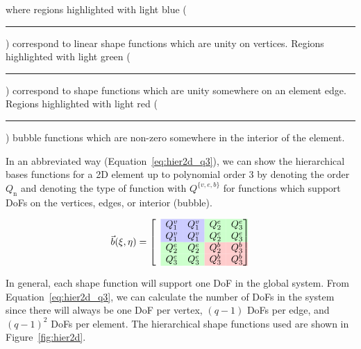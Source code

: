 \documentclass[11pt]{style/memo}
\begin{document}
where regions highlighted with light blue ({\color{blue!20!white}\rule{1em}{1em}})
correspond to linear shape functions which are unity on vertices. Regions highlighted
with light green ({\color{green!20!white}\rule{1em}{1em}}) correspond to shape functions
which are unity somewhere on an element edge. Regions highlighted with light red
({\color{red!20!white}\rule{1em}{1em}}) bubble functions which are non-zero somewhere in
the interior of the element.

In an abbreviated way (Equation~\ref{eq:hier2d_q3}), we can show the hierarchical bases functions for a 2D element up
to polynomial order 3 by denoting the order $Q_\mathrm{n}$ and denoting the type of function
with $Q^{\{v,e,b\}}$ for functions which support DoFs on the vertices, edges, or interior (bubble).

\begin{equation}
    \label{eq:hier2d_q3}
    \vec{b}(\xi,\eta) = \begin{bmatrix}
        & \cellcolor{blue!20!white}  Q_1^v & \cellcolor{blue!20!white}  Q_1^v & \cellcolor{green!20!white} Q_2^e & \cellcolor{green!20!white} Q_3^e \\
        & \cellcolor{blue!20!white}  Q_1^v & \cellcolor{blue!20!white}  Q_1^v & \cellcolor{green!20!white} Q_2^e & \cellcolor{green!20!white} Q_3^e \\
        & \cellcolor{green!20!white} Q_2^e & \cellcolor{green!20!white} Q_2^e & \cellcolor{red!20!white}   Q_2^b & \cellcolor{red!20!white}   Q_3^b \\
        & \cellcolor{green!20!white} Q_3^e & \cellcolor{green!20!white} Q_3^e & \cellcolor{red!20!white}   Q_3^b & \cellcolor{red!20!white}   Q_3^b
    \end{bmatrix}
\end{equation}

In general, each shape function will support one DoF in the global system. From
Equation~\ref{eq:hier2d_q3}, we can calculate the number of DoFs in the system since
there will always be one DoF per vertex, $(q-1)$ DoFs per edge, and $(q-1)^2$ DoFs
per element. The hierarchical shape functions used are shown in Figure~\ref{fig:hier2d}.
\end{document}

